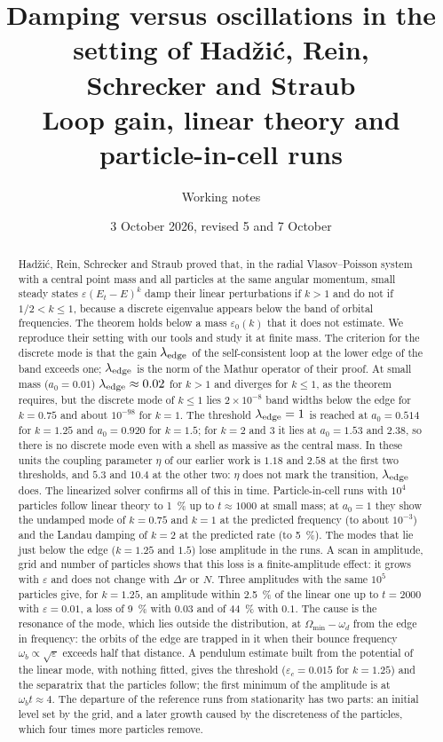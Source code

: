 \documentclass[11pt,a4paper]{article}
\title{Damping versus oscillations in the setting of Hadžić, Rein,\\ Schrecker and Straub\\[0.3em]
       \large Loop gain, linear theory and particle-in-cell runs}
\author{Working notes}
\date{3 October 2026, revised 5 and 7 October}
\begin{document}
\maketitle

\begin{abstract}
Hadžić, Rein, Schrecker and Straub proved that, in the radial Vlasov--Poisson system with
a central point mass and all particles at the same angular momentum, small steady states
$\varepsilon(E_t-E)^k$ damp their linear perturbations if $k>1$ and do not if
$1/2<k\le1$, because a discrete eigenvalue appears below the band of orbital frequencies.
The theorem holds below a mass $\varepsilon_0(k)$ that it does not estimate. We reproduce
their setting with our tools and study it at finite mass. The criterion for the discrete
mode is that the gain $\lambda_{\rm edge}$ of the self-consistent loop at the lower edge of
the band exceeds one; $\lambda_{\rm edge}$ is the norm of the Mathur operator of their
proof. At small mass ($a_0=0.01$) $\lambda_{\rm edge}\approx0.02$ for $k>1$ and diverges
for $k\le1$, as the theorem requires, but the discrete mode of $k\le1$ lies
$2\times10^{-8}$ band widths below the edge for $k=0.75$ and about $10^{-98}$ for $k=1$. The
threshold $\lambda_{\rm edge}=1$ is reached at $a_0=0.514$ for $k=1.25$ and $a_0=0.920$ for
$k=1.5$; for $k=2$ and $3$ it lies at $a_0=1.53$ and $2.38$, so there is no discrete mode even
with a shell as massive as the central mass. In these units the coupling parameter $\eta$ of
our earlier work is $1.18$ and $2.58$ at the first two thresholds, and $5.3$ and $10.4$ at
the other two: $\eta$ does not mark the transition, $\lambda_{\rm edge}$ does. The
linearized solver confirms all of this in time. Particle-in-cell runs with $10^4$ particles
follow linear theory to \SI{1}{\%} up to $t\approx1000$ at small mass; at $a_0=1$ they show the
undamped mode of $k=0.75$ and $k=1$ at the predicted frequency (to about $10^{-3}$) and the
Landau damping of $k=2$ at the predicted rate (to \SI{5}{\%}). The modes that lie just below
the edge ($k=1.25$ and $1.5$) lose amplitude in the runs. A scan in amplitude, grid and
number of particles shows that this loss is a finite-amplitude effect: it grows with
$\varepsilon$ and does not change with $\Delta r$ or $N$. Three amplitudes with the same $10^5$
particles give, for $k=1.25$, an amplitude within \SI{2.5}{\%} of the linear one up to $t=2000$ with
$\varepsilon=0.01$, a loss of \SI{9}{\%} with $0.03$ and of \SI{44}{\%} with $0.1$. The cause is the
resonance of the mode, which lies outside the distribution, at $\Omega_{\min}-\omega_d$ from the
edge in frequency: the orbits of the edge are trapped in it when their bounce frequency
$\omega_b\propto\sqrt{\varepsilon}$ exceeds half that distance. A pendulum estimate built from the
potential of the linear mode, with nothing fitted, gives the threshold ($\varepsilon_c=0.015$ for
$k=1.25$) and the separatrix that the particles follow; the first minimum of the amplitude is
at $\omega_bt\approx4$. The departure of the reference
runs from stationarity has two parts: an initial level set by the grid, and a later growth
caused by the discreteness of the particles, which four times more particles remove.
\end{abstract}
\end{document}
